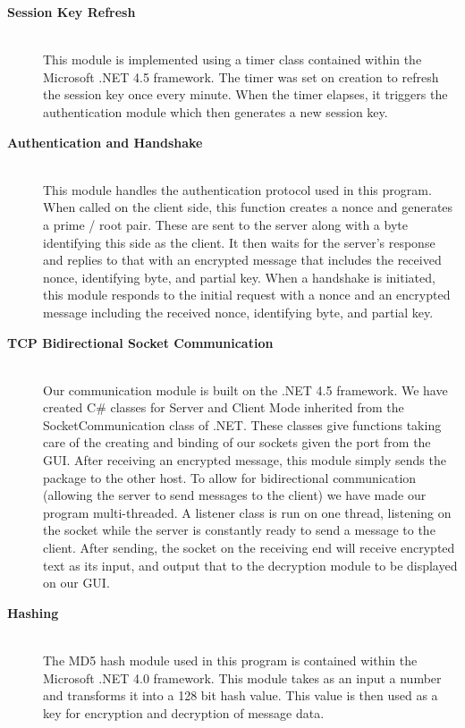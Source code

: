 \documentclass[journal]{IEEEtran}
\begin{document}
\begin{description}
	\item[\bfseries Session Key Refresh] \hfill \\
	This module is implemented using a timer class contained within the Microsoft .NET 4.5 framework. The timer was set on creation to refresh the session key once every minute. When the timer elapses, it triggers the authentication module which then generates a new session key. 
	
	\item[\bfseries Authentication and Handshake] \hfill \\
	This module handles the authentication protocol used in this program. When called on the client side, this function creates a nonce and generates a prime / root pair. These are sent to the server along with a byte identifying this side as the client. It then waits for the server's response and replies to that with an encrypted message that includes the received nonce, identifying byte, and partial key. When a handshake is initiated, this module responds to the initial request with a nonce and an encrypted message including the received nonce, identifying byte, and partial key.
	
	\item[\bfseries TCP Bidirectional Socket Communication] \hfill \\
	Our communication module is built on the .NET 4.5 framework. We have created C\# classes for Server and Client Mode inherited from the SocketCommunication class of .NET. These classes give functions taking care of the creating and binding of our sockets given the port from the GUI. After receiving an encrypted message, this module simply sends the package to the other host. To allow for bidirectional communication (allowing the server to send messages to the client) we have made our program multi-threaded. A listener class is run on one thread, listening on the socket while the server is constantly ready to send a message to the client. After sending, the socket on the receiving end will receive encrypted text as its input, and output that to the decryption module to be displayed on our GUI.
	
	\item[\bfseries Hashing] \hfill \\
	The MD5 hash module used in this program is contained within the Microsoft .NET 4.0 framework. This module takes as an input a number and transforms it into a 128 bit hash value. This value is then used as a key for encryption and decryption of message data.
\end{description}
\end{document}
